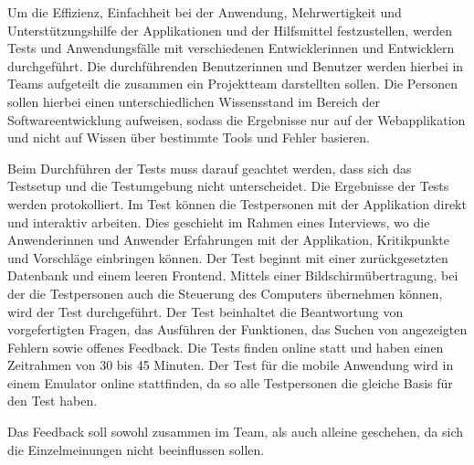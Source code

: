 Um die Effizienz, Einfachheit bei der Anwendung, Mehrwertigkeit und Unterstützungshilfe der Applikationen und der Hilfsmittel festzustellen, werden Tests und Anwendungsfälle mit verschiedenen Entwicklerinnen und Entwicklern durchgeführt. Die durchführenden Benutzerinnen und Benutzer werden hierbei in Teams aufgeteilt die zusammen ein Projektteam darstellten sollen. Die Personen sollen hierbei einen unterschiedlichen Wissensstand im Bereich der Softwareentwicklung aufweisen, sodass die Ergebnisse nur auf der Webapplikation und nicht auf Wissen über bestimmte Tools und Fehler basieren. 

Beim Durchführen der Tests muss darauf geachtet werden, dass sich das Testsetup und die Testumgebung nicht unterscheidet. Die Ergebnisse der Tests werden protokolliert. Im Test können die Testpersonen mit der Applikation direkt und interaktiv arbeiten. Dies geschieht im Rahmen eines Interviews, wo die Anwenderinnen und Anwender Erfahrungen mit der Applikation, Kritikpunkte und Vorschläge einbringen können. Der Test beginnt mit einer zurückgesetzten Datenbank und einem leeren Frontend. Mittels einer Bildschirmübertragung, bei der die Testpersonen auch die Steuerung des Computers übernehmen können, wird der Test durchgeführt.
Der Test beinhaltet die Beantwortung von vorgefertigten Fragen, das Ausführen der Funktionen, das Suchen von angezeigten Fehlern sowie offenes Feedback. Die Tests finden online statt und haben einen Zeitrahmen von 30 bis 45 Minuten. Der Test für die mobile Anwendung wird in einem Emulator online stattfinden, da so alle Testpersonen die gleiche Basis für den Test haben.

Das Feedback soll sowohl zusammen im Team, als auch alleine geschehen, da sich die Einzelmeinungen nicht beeinflussen sollen.
